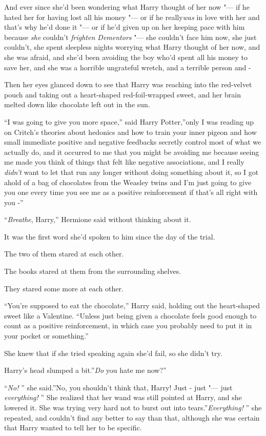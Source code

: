 And ever since she'd been wondering what Harry thought of her now "--- if
he hated her for having lost all his money "--- or if he really\emph{was}
in love with her and that's why he'd done it "--- or if he'd given up on
her keeping pace with him because \emph{she} couldn't \emph{frighten
Dementors} "--- she couldn't face him now, she just couldn't, she spent
sleepless nights worrying what Harry thought of her now, and she was
afraid, and she'd been avoiding the boy who'd spent all his money to
save her, and she was a horrible ungrateful wretch, and a terrible
person and -

Then her eyes glanced down to see that Harry was reaching into the
red-velvet pouch and taking out a heart-shaped red-foil-wrapped sweet,
and her brain melted down like chocolate left out in the sun.

``I was going to give you more space,'' said Harry Potter,''only I was
reading up on Critch's theories about hedonics and how to train your
inner pigeon and how small immediate positive and negative feedbacks
secretly control most of what we actually do, and it occurred to me that
you might be avoiding me because seeing me made you think of things that
felt like negative associations, and I really \emph{didn't} want to let
that run any longer without doing something about it, so I got ahold of
a bag of chocolates from the Weasley twins and I'm just going to give
you one every time you see me as a positive reinforcement if that's all
right with you -''

``\emph{Breathe}, Harry,'' Hermione said without thinking about it.

It was the first word she'd spoken to him since the day of the trial.

The two of them stared at each other.

The books stared at them from the surrounding shelves.

They stared some more at each other.

``You're supposed to eat the chocolate,'' Harry said, holding out the
heart-shaped sweet like a Valentine. ``Unless just being given a
chocolate feels good enough to count as a positive reinforcement, in
which case you probably need to put it in your pocket or something.''

She knew that if she tried speaking again she'd fail, so she didn't try.

Harry's head slumped a bit.''\emph{Do} you hate me now?''

``\emph{No!} '' she said.''No, you shouldn't think that, Harry! Just -
just "--- just \emph{everything!} '' She realized that her wand was still
pointed at Harry, and she lowered it. She was trying very hard not to
burst out into tears.''\emph{Everything!} '' she repeated, and couldn't
find any better to say than that, although she was certain that Harry
wanted to tell her to be specific.


